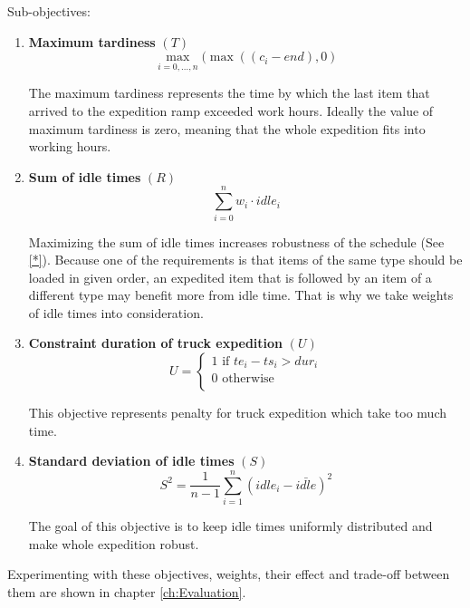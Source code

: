 \documentclass{ctuthesis}
\begin{document}
Sub-objectives:

\begin{enumerate}
\item \textbf{Maximum tardiness} $(T)$\\ \begin{equation}\max_{i=0,\ldots,n}(\max((c_i - end), 0)\end{equation}

The maximum tardiness represents the time by which the last item that arrived to the expedition ramp exceeded work hours. Ideally the value of maximum tardiness is zero, meaning that the whole expedition fits into working hours.

\item \textbf{Sum of idle times} $(R)$\\ 
\begin{equation}
    \sum_{i=0}^{n} w_i \cdot idle_i
\end{equation}

Maximizing the sum of idle times increases robustness of the schedule (See \ref{*}). Because one of the requirements is that items of the same type should be loaded in given order, an expedited item that is followed by an item of a different type may benefit more from idle time. That is why we take weights of idle times into consideration.

\item \textbf{Constraint duration of truck expedition} $(U)$
\begin{equation} 
   U = \begin{cases}
        1 \text{ if } te_i - ts_i > dur_i\\
        \text{0 otherwise}\\
       \end{cases}
\end{equation}

This objective represents penalty for truck expedition which take too much time.

\item \textbf{Standard deviation of idle times} $(S)$
\begin{equation} 
    S^2=\frac{1}{n-1}\sum_{i=1}^{n} (idle_{i} -\bar{idle})^2 
\end{equation}

The goal of this objective is to keep idle times uniformly distributed and make whole expedition robust.

\end{enumerate}
 
 Experimenting with these objectives, weights, their effect and trade-off between them are shown in chapter \ref{ch:Evaluation}.
\end{document}
